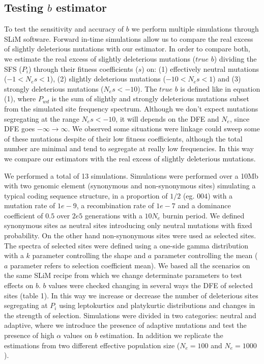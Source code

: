 \documentclass[11pt]{article}
\begin{document}
\subsection{Testing $b$ estimator}
To test the sensitivity and accuracy of $b$ we perform multiple simulations through SLiM software. Forward in-time simulations allow us to compare the real excess of slightly deleterious mutations with our estimator. In order to compare both, we estimate the real excess of slightly deleterious mutations ($true$ $b$) dividing the SFS ($P_{i}$) through their fitness coefficients ($s$) on: (1) effectively neutral mutations ($-1 < N_{e}s < 1$), (2) slightly deleterious mutations ($-10 < N_{e}s < 1$) and (3) strongly deleterious mutations ($N_{e}s < -10$). The $true$ $b$ is defined like in equation (1), where $P_{wd}$ is the sum of slightly and strongly deleterious mutations subset from the simulated site frequency spectrum. Although we don't expect mutations segregating at the range $N_{e}s < -10$, it will depends on the DFE and $N_{e}$, since DFE goes $-\infty \to \infty$. We observed some situations were linkage could sweep some of these mutations despite of their low fitness coefficients, although the total number are minimal and tend to segregate at really low frequencies. In this way we compare our estimators with the real excess of slightly deleterious mutations.

We performed a total of 13 simulations. Simulations were performed over a 10Mb with two genomic element (synonymous and non-synonymous sites) simulating a typical coding sequence structure, in a proportion of ${1}/{2}$ (eg. $004$) with a mutation rate of $1e-9$, a recombination rate of $1e-7$ and a dominance coefficient of $0.5$ over $2e5$ generations with a $10N_{e}$ burnin period. We defined synonymous sites as neutral sites introducing only neutral mutations with fixed probability. On the other hand non-synonymous sites were used as selected sites. The spectra of selected sites were defined using a one-side gamma distribution with a $k$ parameter controlling the shape and $a$ parameter controlling the mean ($a$ parameter refers to selection coefficient mean). We based all the scenarios on the same SLiM recipe from which we change determinate parameters to test effects on $b$. $b$ values were checked changing in several ways the DFE of selected sites (table 1). In this way we increase or decrease the number of deleterious sites segregating at $P_{i}$ using leptokurtics and platykurtic distributions and changes in the strength of selection. Simulations were divided in two categories: neutral and adaptive, where we introduce the presence of adaptive mutations and test the presence of high $\alpha$ values on $b$ estimation. In addition we replicate the estimations from two different effective population size ($N_{e} = 100$ and $N_{e} = 1000$).
\end{document}
